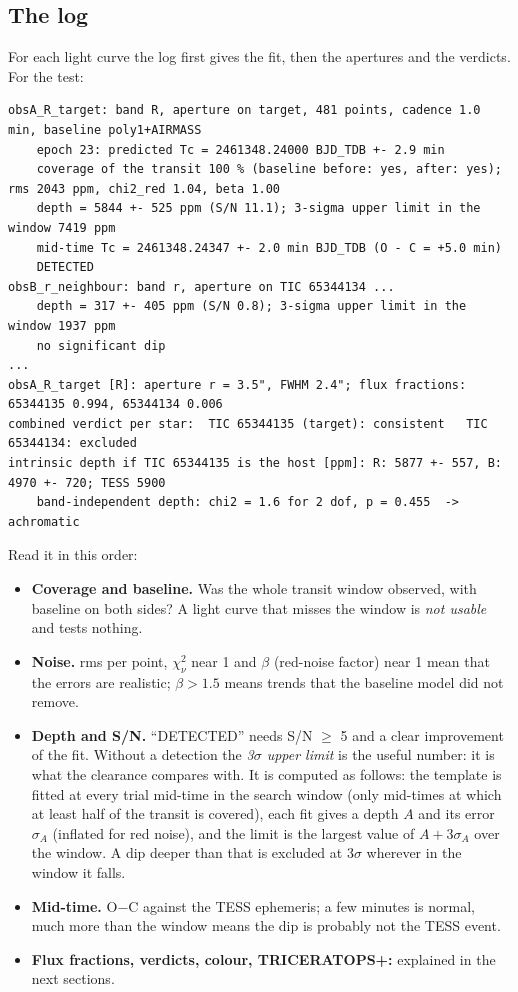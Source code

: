 \documentclass[11pt,a4paper]{report}
\begin{document}
\subsection{The log}
For each light curve the log first gives the fit, then the apertures and
the verdicts. For the test:
\begin{lstlisting}
obsA_R_target: band R, aperture on target, 481 points, cadence 1.0 min, baseline poly1+AIRMASS
    epoch 23: predicted Tc = 2461348.24000 BJD_TDB +- 2.9 min
    coverage of the transit 100 % (baseline before: yes, after: yes); rms 2043 ppm, chi2_red 1.04, beta 1.00
    depth = 5844 +- 525 ppm (S/N 11.1); 3-sigma upper limit in the window 7419 ppm
    mid-time Tc = 2461348.24347 +- 2.0 min BJD_TDB (O - C = +5.0 min)
    DETECTED
obsB_r_neighbour: band r, aperture on TIC 65344134 ...
    depth = 317 +- 405 ppm (S/N 0.8); 3-sigma upper limit in the window 1937 ppm
    no significant dip
...
obsA_R_target [R]: aperture r = 3.5", FWHM 2.4"; flux fractions: 65344135 0.994, 65344134 0.006
combined verdict per star:  TIC 65344135 (target): consistent   TIC 65344134: excluded
intrinsic depth if TIC 65344135 is the host [ppm]: R: 5877 +- 557, B: 4970 +- 720; TESS 5900
    band-independent depth: chi2 = 1.6 for 2 dof, p = 0.455  -> achromatic
\end{lstlisting}
Read it in this order:
\begin{itemize}
\item \textbf{Coverage and baseline.} Was the whole transit window observed,
with baseline on both sides? A light curve that misses the window is
\emph{not usable} and tests nothing.
\item \textbf{Noise.} rms per point, $\chi^2_\nu$ near 1 and $\beta$ (red-noise
factor) near 1 mean that the errors are realistic; $\beta > 1.5$ means trends
that the baseline model did not remove.
\item \textbf{Depth and S/N.} ``DETECTED'' needs S/N $\geq$ 5 and a clear
improvement of the fit. Without a detection the \emph{3$\sigma$ upper limit}
is the useful number: it is what the clearance compares with. It is computed
as follows: the template is fitted at every trial mid-time in the search
window (only mid-times at which at least half of the transit is covered),
each fit gives a depth $A$ and its error $\sigma_A$ (inflated for red noise),
and the limit is the largest value of $A + 3\sigma_A$ over the window. A dip
deeper than that is excluded at 3$\sigma$ wherever in the window it falls.
\item \textbf{Mid-time.} O$-$C against the TESS ephemeris; a few minutes is
normal, much more than the window means the dip is probably not the TESS
event.
\item \textbf{Flux fractions, verdicts, colour, TRICERATOPS+:} explained in
the next sections.
\end{itemize}
\end{document}
